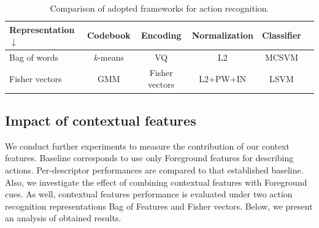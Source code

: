 \begin{table}[h!]
\caption{Comparison of adopted frameworks for action recognition.}
\begin{center}
{
\begin{tabular}{ l| c c c c c }
\hline
Representation $\downarrow$ & Codebook & Encoding & Normalization & Classifier \\
\hline
Bag of words & \textit{k}-means & VQ & L2 & MCSVM \\
Fisher vectors & GMM & Fisher vectors & L2+PW+IN & LSVM \\
\hline
\end{tabular}
}
\end{center}
\label{tab:frameworks}
\end{table}

\subsection{Impact of contextual features}
We conduct further experiments to measure the  contribution of our context features. Baseline corresponds to use only Foreground features for describing actions. Per-descriptor performances are compared to that established baseline. Also, we investigate the effect of combining contextual features with Foreground cues. As well, contextual features performance is evaluated under two action recognition representations \ie Bag of Features and Fisher vectors. Below, we present an analysis of obtained results.

